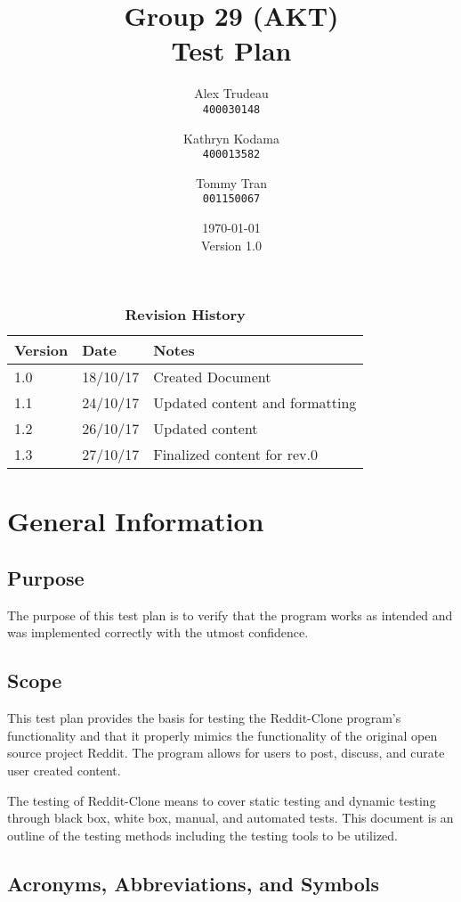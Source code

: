 \documentclass[12pt,fleqn]{article}
\title{Group 29 (AKT)\\ Test Plan}
\author{
Alex Trudeau\\
	\texttt{400030148}
\and
Kathryn Kodama\\
  	\texttt{400013582}
\and
Tommy Tran\\
	\texttt{001150067}
}
\date{\today\\Version 1.0}
\begin{document}
\maketitle



\pagebreak
\tableofcontents

\listoftables
\listoffigures

\begin{table}[ht]
\caption{\bf Revision History}
\begin{tabularx}{\textwidth}{p{3cm}p{2cm}X}
\toprule {\bf Version} & {\bf Date} & {\bf Notes}\\
\midrule
1.0 & 18/10/17 & Created Document\\
1.1 & 24/10/17 & Updated  content and formatting\\
1.2 & 26/10/17 & Updated content
\\
1.3 & 27/10/17 & Finalized content for rev.0 \\
\bottomrule
\end{tabularx}
\end{table}


\pagebreak



\section {General Information}

\subsection {Purpose}
The purpose of this test plan is to verify that the program works as intended and was implemented correctly with the utmost confidence.

\subsection {Scope}
This test plan provides the basis for testing the Reddit-Clone program's functionality and that it properly mimics the functionality of the original open source project Reddit.  The program allows for users to post, discuss, and curate user created content.

The testing of Reddit-Clone means to cover static testing and dynamic testing through black box, white box, manual, and automated tests.  This document is an outline of the testing methods including the testing tools to be utilized.

\subsection {Acronyms, Abbreviations, and Symbols}
\end{document}
